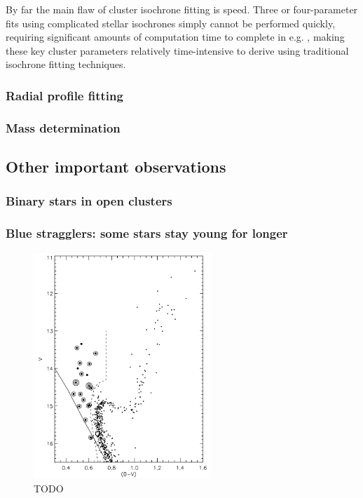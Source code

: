 By far the main flaw of cluster isochrone fitting is speed. Three or four-parameter fits using complicated stellar isochrones simply cannot be performed quickly, requiring significant amounts of computation time to complete in e.g. \cite{yen_reanalysis_2018}, making these key cluster parameters relatively time-intensive to derive using traditional isochrone fitting techniques.

\subsubsection{Radial profile fitting}

\subsubsection{Mass determination}


\subsection{Other important observations}
\label{sec:intro:history:other_obs}

\subsubsection{Binary stars in open clusters}

\subsubsection{Blue stragglers: some stars stay young for longer}

\begin{figure}[tb]
	\centering
	\includegraphics[width=0.6\textwidth]{fig/c1/ngc_188_blue_stragglers.png}
	\caption[TODO]{TODO}
	\label{fig:intro:history:blue_stragglers}
\end{figure}

